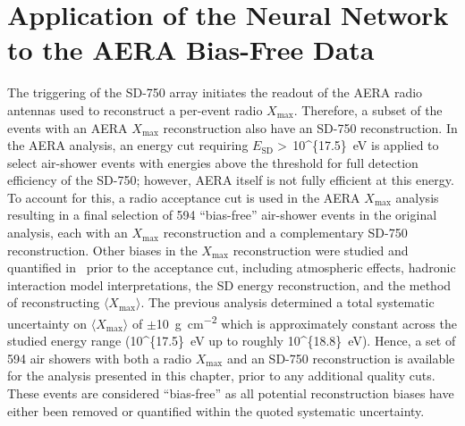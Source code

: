

\section{Application of the Neural Network to the AERA Bias-Free Data}\label{sec:application}


The triggering of the SD-750 array initiates the readout of the AERA radio antennas used to reconstruct a per-event radio $X_{\text{max}}$.
Therefore, a subset of the events with an AERA $X_{\text{max}}$ reconstruction also have an SD-750 reconstruction.
In the AERA analysis, an energy cut requiring $E_{\text{SD}}>$\,\qty[parse-numbers=false]{10^{17.5}}{\electronvolt} is applied to select air-shower events with energies above the threshold for full detection efficiency of the SD-750; however, AERA itself is not fully efficient at this energy.
To account for this, a radio acceptance cut is used in the AERA $X_{\text{max}}$ analysis resulting in a final selection of 594 ``bias-free'' air-shower events in the original analysis, each with an $X_{\text{max}}$ reconstruction and a complementary SD-750 reconstruction.
Other biases in the $X_{\text{max}}$ reconstruction were studied and quantified in~\cite{auger_prd2024_aeraxmax,auger_prl2024_aeraxmax} prior to the acceptance cut, including atmospheric effects, hadronic interaction model interpretations, the SD energy reconstruction, and the method of reconstructing $\langle X_{\text{max}}\rangle$.
The previous analysis determined a total systematic uncertainty on $\langle X_{\text{max}}\rangle$ of $\pm$\qty{10}{\gram\per\centi\meter\squared} which is approximately constant across the studied energy range (\qty[parse-numbers=false]{10^{17.5}}{\electronvolt} up to roughly \qty[parse-numbers=false]{10^{18.8}}{\electronvolt}).
Hence, a set of 594 air showers with both a radio $X_{\text{max}}$ and an SD-750 reconstruction is available for the analysis presented in this chapter, prior to any additional quality cuts.
These events are considered ``bias-free'' as all potential reconstruction biases have either been removed or quantified within the quoted systematic uncertainty. 


